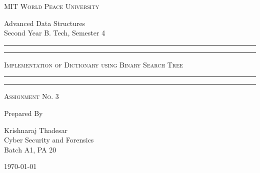 \documentclass[11pt]{article}
\begin{document}
\begin{titlepage}
    \centering


    \huge\textsc{
        MIT World Peace University
    }\\

    \vspace{0.75\baselineskip} %

    \LARGE{
        Advanced Data Structures\\
        Second Year B. Tech, Semester 4
    }

    \vfill %


    \rule{\textwidth}{1.6pt}\vspace*{-\baselineskip}\vspace*{2pt}
    \rule{\textwidth}{0.6pt}
    \vspace{0.75\baselineskip} %



    \huge{\textsc{
            Implementation of Dictionary using Binary Search Tree
        }} \\



    \vspace{0.5\baselineskip} %
    \rule{\textwidth}{0.6pt}\vspace*{-\baselineskip}\vspace*{2.8pt}
    \rule{\textwidth}{1.6pt}

    \vspace{1\baselineskip} %


    \LARGE\textsc{
        Assignment No. 3
    } %
    \vfill


    Prepared By
    \vspace{0.5\baselineskip} %

    \Large{
        Krishnaraj Thadesar \\
        Cyber Security and Forensics\\
        Batch A1, PA 20
    }


    \vspace{0.5\baselineskip} %
    \today

\end{titlepage}
\end{document}
